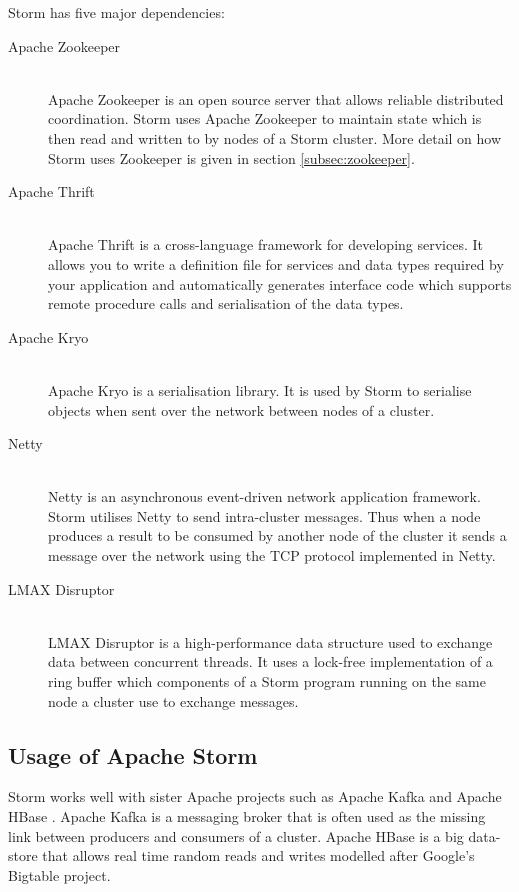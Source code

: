 \documentclass[bsc,logo,frontabs,twoside,singlespacing,normalheadings,parskip]{infthesis}\usepackage[]{graphicx}\usepackage[]{color}
\begin{document}
Storm has five major dependencies:

\begin{description}
	\item[Apache Zookeeper] \hfill \\
	Apache Zookeeper \cite{ApacheZookeeper} is an open source server that allows reliable distributed coordination. Storm uses Apache Zookeeper to maintain state which is then read and written to by nodes of a Storm cluster. More detail on how Storm uses Zookeeper is given in section \ref{subsec:zookeeper}.
	\item[Apache Thrift] \hfill \\
	Apache Thrift \cite{ApacheThrift} is a cross-language framework for developing services. It allows you to write a definition file for services and data types required by your application and automatically generates interface code which supports remote procedure calls and serialisation of the data types.
	\item[Apache Kryo] \hfill \\
	Apache Kryo \cite{ApacheKryo} is a serialisation library. It is used by Storm to serialise objects when sent over the network between nodes of a cluster.
	\item[Netty] \hfill \\
	Netty \cite{Netty} is an asynchronous event-driven network application framework. Storm utilises Netty to send intra-cluster messages. Thus when a node produces a result to be consumed by another node of the cluster it sends a message over the network using the TCP protocol implemented in Netty.
	\item[LMAX Disruptor] \hfill \\
	LMAX Disruptor \cite{LMAXDisruptor} is a high-performance data structure used to exchange data between concurrent threads. It uses a lock-free implementation of a ring buffer which components of a Storm program running on the same node a cluster use to exchange messages.
\end{description}

\subsection{Usage of Apache Storm}

Storm works well with sister Apache projects such as Apache Kafka \cite{ApacheKafka} and Apache HBase \cite{ApacheHBase}. Apache Kafka is a messaging broker that is often used as the missing link between producers and consumers of a cluster. Apache HBase is a big data-store that allows real time random reads and writes modelled after Google's Bigtable project. \cite{Bigtable}
\end{document}
